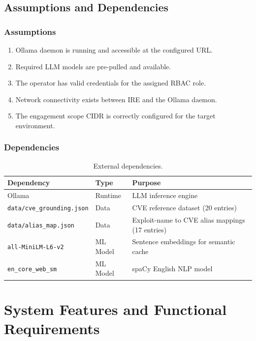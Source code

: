 \documentclass[10pt,journal,onecolumn]{IEEEtran}
\begin{document}
\subsection{Assumptions and Dependencies}

\subsubsection{Assumptions}
\begin{enumerate}
\item Ollama daemon is running and accessible at the configured URL.
\item Required LLM models are pre-pulled and available.
\item The operator has valid credentials for the assigned RBAC role.
\item Network connectivity exists between IRE and the Ollama daemon.
\item The engagement scope CIDR is correctly configured for the target environment.
\end{enumerate}

\subsubsection{Dependencies}
\begin{table}[h]
\caption{External dependencies.}
\label{tab:deps}
\begin{tabularx}{\columnwidth}{l l X}
\toprule
\textbf{Dependency} & \textbf{Type} & \textbf{Purpose}\\
\midrule
Ollama & Runtime & LLM inference engine\\
\texttt{data/cve\_grounding.json} & Data & CVE reference dataset (20 entries)\\
\texttt{data/alias\_map.json} & Data & Exploit-name to CVE alias mappings (17 entries)\\
\texttt{all-MiniLM-L6-v2} & ML Model & Sentence embeddings for semantic cache\\
\texttt{en\_core\_web\_sm} & ML Model & spaCy English NLP model\\
\bottomrule
\end{tabularx}
\end{table}
\section{System Features and Functional Requirements}
\end{document}
